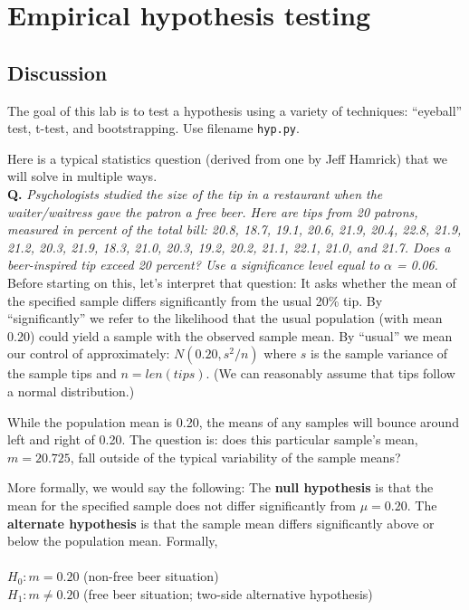 \chapter{Empirical hypothesis testing}

\setcounter{problem}{1}
\section{Discussion}

\begin{fullwidth}

The goal of this lab is to test a hypothesis using a variety of techniques: ``eyeball'' test, t-test, and bootstrapping. Use filename {\tt hyp.py}. 

Here is a typical statistics question (derived from one by Jeff Hamrick) that we will solve in multiple ways.\\

{\bf Q.} {\em Psychologists studied the size of the tip in a restaurant when the waiter/waitress gave the patron a free beer. Here are tips from 20 patrons, measured in percent of the total bill: 20.8, 18.7, 19.1, 20.6, 21.9, 20.4, 22.8,
        21.9, 21.2, 20.3, 21.9, 18.3, 21.0, 20.3,
        19.2, 20.2, 21.1, 22.1, 21.0, and 21.7. Does a beer-inspired tip exceed 20 percent? Use a significance level equal to $\alpha$ = 0.06.}\\

Before starting on this, let's interpret that question: It asks whether the mean of the specified sample differs significantly from the usual 20\% tip. By ``significantly'' we refer to the likelihood that the usual population (with mean 0.20) could yield a sample with the observed sample mean. By ``usual'' we mean our control of approximately: $N(0.20, s^2/n)$ where $s$ is the sample variance of the sample tips and $n=len(tips)$. (We can reasonably assume  that tips follow a normal distribution.)

While the population mean is 0.20, the means of any samples will bounce around left and right of 0.20.  The question is: does this particular sample's mean, $m=20.725$, fall outside of the typical variability of the sample means?

More formally, we would say the following: The {\bf null hypothesis} is that the mean for the specified sample does not differ significantly from $\mu = 0.20$.  The {\bf alternate hypothesis} is that the sample mean differs significantly above or below the population mean.  Formally,\\
~\\
$H_0: m = 0.20$ (non-free beer situation)\\
$H_1: m \neq 0.20$ (free beer situation; two-side alternative hypothesis)\\


\end{fullwidth}
